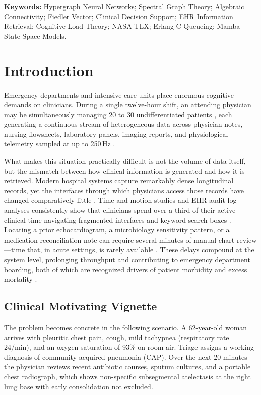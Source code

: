 \documentclass[10pt, onecolumn]{article}
\begin{document}
\noindent\textbf{Keywords:}
Hypergraph Neural Networks; Spectral Graph Theory; Algebraic Connectivity;
Fiedler Vector; Clinical Decision Support; EHR Information Retrieval;
Cognitive Load Theory; NASA-TLX; Erlang C Queueing; Mamba State-Space Models.

\section{Introduction}
\label{sec:introduction}

Emergency departments and intensive care units place enormous cognitive demands on clinicians. During a single twelve-hour shift, an attending physician may be simultaneously managing 20 to 30 undifferentiated patients \cite{topol2019high,miotto2018deep}, each generating a continuous stream of heterogeneous data across physician notes, nursing flowsheets, laboratory panels, imaging reports, and physiological telemetry sampled at up to 250\,Hz \cite{johnson2023mimic,hyland2020hirid}.

What makes this situation practically difficult is not the volume of data itself, but the mismatch between how clinical information is generated and how it is retrieved. Modern hospital systems capture remarkably dense longitudinal records, yet the interfaces through which physicians access those records have changed comparatively little \cite{sutton2020overview,wornow2023shaky}. Time-and-motion studies and EHR audit-log analyses consistently show that clinicians spend over a third of their active clinical time navigating fragmented interfaces and keyword search boxes \cite{sinsky2016allocation,zheng2021analyzing}. Locating a prior echocardiogram, a microbiology sensitivity pattern, or a medication reconciliation note can require several minutes of manual chart review---time that, in acute settings, is rarely available \cite{obermeyer2016predicting,singh2014types}. These delays compound at the system level, prolonging throughput and contributing to emergency department boarding, both of which are recognized drivers of patient morbidity and excess mortality \cite{singer2011crowding,pines2011emergency,singh2014types}.

\subsection{Clinical Motivating Vignette}

The problem becomes concrete in the following scenario. A 62-year-old woman arrives with pleuritic chest pain, cough, mild tachypnea (respiratory rate 24/min), and an oxygen saturation of 93\% on room air. Triage assigns a working diagnosis of community-acquired pneumonia (CAP). Over the next 20 minutes the physician reviews recent antibiotic courses, sputum cultures, and a portable chest radiograph, which shows non-specific subsegmental atelectasis at the right lung base with early consolidation not excluded.
\end{document}
